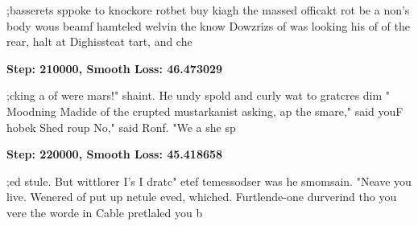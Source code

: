 \begin{spverbatim}
;basserets sppoke to knockore rotbet buy kiagh the massed officakt rot be a non's body wous beamf hamteled welvin the know Dowzrizs of was looking his of of the rear, halt at Dighissteat tart, and che 
\end{spverbatim}
\vspace{1em}
\textbf{Step: 210000, Smooth Loss: 46.473029}
\begin{spverbatim}
;cking a of were mars!" shaint. 
He undy spold and curly wat to gratcres dim
"
Moodning Madide of the crupted mustarkanist asking, ap the smare," said youF hobek
Shed roup No," said Ronf.  "We a she sp
\end{spverbatim}
\vspace{1em}
\textbf{Step: 220000, Smooth Loss: 45.418658}
\begin{spverbatim}
;ed stule.  But wittlorer I's I dratc" etef temessodser was he smomsain.
"Neave you live. Wenered of put up netule eved, whiched. Furtlende-one durverind tho you vere the worde in Cable pretlaled you b
\end{spverbatim}

